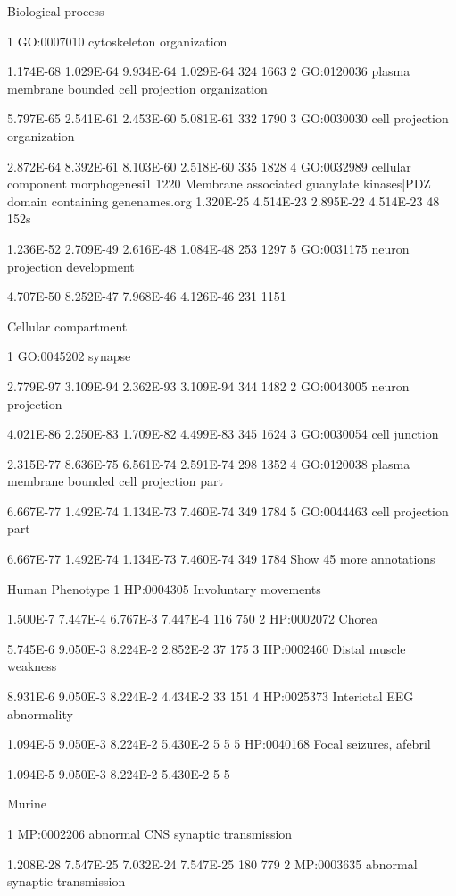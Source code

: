 Biological process


1 
GO:0007010 
cytoskeleton organization 

1.174E-68 
1.029E-64 
9.934E-64 
1.029E-64 
324 
1663 
2 
GO:0120036 
plasma membrane bounded cell projection organization 

5.797E-65 
2.541E-61 
2.453E-60 
5.081E-61 
332 
1790 
3 
GO:0030030 
cell projection organization 

2.872E-64 
8.392E-61 
8.103E-60 
2.518E-60 
335 
1828 
4 
GO:0032989 
cellular component morphogenesi1 1220 Membrane associated guanylate kinases|PDZ domain containing genenames.org 1.320E-25 4.514E-23 2.895E-22 4.514E-23 48 152s 

1.236E-52 
2.709E-49 
2.616E-48 
1.084E-48 
253 
1297 
5 
GO:0031175 
neuron projection development 

4.707E-50 
8.252E-47 
7.968E-46 
4.126E-46 
231 
1151


Cellular compartment


1 
GO:0045202 
synapse 

2.779E-97 
3.109E-94 
2.362E-93 
3.109E-94 
344 
1482 
2 
GO:0043005 
neuron projection 

4.021E-86 
2.250E-83 
1.709E-82 
4.499E-83 
345 
1624 
3 
GO:0030054 
cell junction 

2.315E-77 
8.636E-75 
6.561E-74 
2.591E-74 
298 
1352 
4 
GO:0120038 
plasma membrane bounded cell projection part 

6.667E-77 
1.492E-74 
1.134E-73 
7.460E-74 
349 
1784 
5 
GO:0044463 
cell projection part 

6.667E-77 
1.492E-74 
1.134E-73 
7.460E-74 
349 
1784 
Show 45 more annotations


Human Phenotype
1 
HP:0004305 
Involuntary movements 

1.500E-7 
7.447E-4 
6.767E-3 
7.447E-4 
116 
750 
2 
HP:0002072 
Chorea 

5.745E-6 
9.050E-3 
8.224E-2
2.852E-2 
37 
175 
3 
HP:0002460 
Distal muscle weakness 

8.931E-6 
9.050E-3 
8.224E-2
4.434E-2 
33 
151 
4 
HP:0025373 
Interictal EEG abnormality 

1.094E-5 
9.050E-3 
8.224E-2
5.430E-2
5 
5 
5 
HP:0040168 
Focal seizures, afebril 

1.094E-5 
9.050E-3 
8.224E-2
5.430E-2
5 
5

Murine


1 
MP:0002206 
abnormal CNS synaptic transmission 

1.208E-28 
7.547E-25 
7.032E-24 
7.547E-25 
180 
779 
2 
MP:0003635 
abnormal synaptic transmission 

